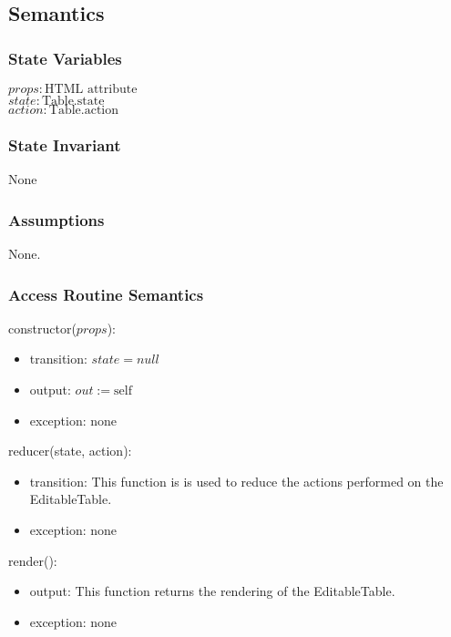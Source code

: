 \documentclass[12pt, titlepage]{article}
\begin{document}
\subsection{Semantics}

\subsubsection{State Variables}

$\mathit{props}: \text{HTML attribute}$\\
$\mathit{state}: \text{Table.state}$\\
$\mathit{action}: \text{Table.action}$

\subsubsection{State Invariant}

None

\subsubsection{Assumptions}

None.

\subsubsection{Access Routine Semantics}

\noindent constructor($props$):
\begin{itemize}
\item transition: $\mathit{state} = null $
\item output: $out := \mbox{self}$
\item exception: none
\end{itemize}

\noindent reducer(state, action):
\begin{itemize}
\item transition: This function is is used to reduce the actions performed on the EditableTable.
\item exception: none
\end{itemize}

\noindent render():
\begin{itemize}
\item output: This function returns the rendering of the EditableTable.
\item exception: none
\end{itemize}
\end{document}
